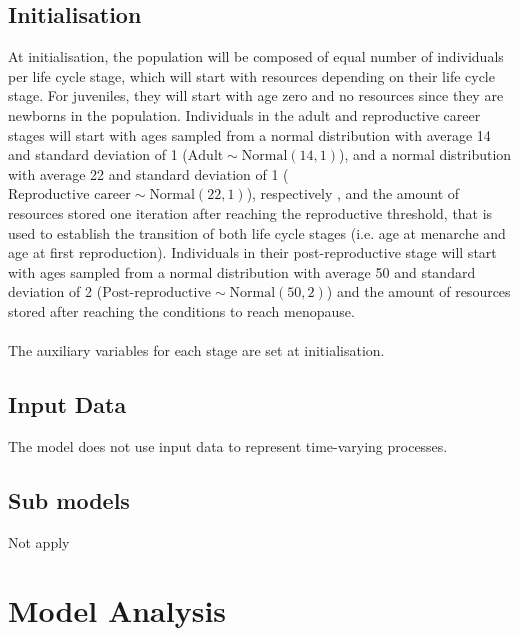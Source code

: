 \documentclass{article}
\begin{document}
\subsection{Initialisation}

At initialisation, the population will be composed of equal number of individuals per life cycle stage, which will start with resources depending on their life cycle stage. For juveniles, they will start with age zero and no resources since they are newborns in the population. Individuals in the adult and reproductive career stages will start with ages sampled from a normal distribution with average 14 and standard deviation of 1 ($\text{Adult}\sim \text{Normal}(14,1)$), and a normal distribution with average 22 and standard deviation of 1 ($\text{Reproductive career}\sim \text{Normal}(22,1)$), respectively \citep{kramer2010teen,morabia1998international,thomas2001international}, and the amount of resources stored one iteration after reaching the reproductive threshold, that is used to establish the transition of both life cycle stages (i.e. age at menarche and age at first reproduction). Individuals in their post-reproductive stage will start with ages sampled from a normal distribution with average 50 and standard deviation of 2 ($\text{Post-reproductive}\sim \text{Normal}(50,2)$) \citep{morabia1998international,thomas2001international} and the amount of resources stored after reaching the conditions to reach menopause. 
\\\\
The auxiliary variables for each stage are set at initialisation.

\subsection{Input Data}

The model does not use input data to represent time-varying processes.

\subsection{Sub models}

Not apply

\section{Model Analysis}
\end{document}
